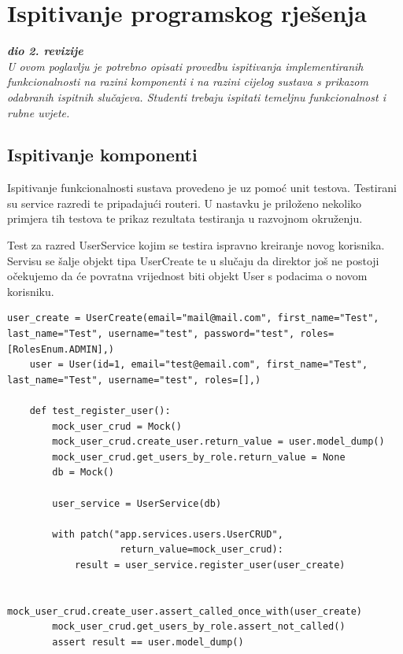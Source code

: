 			\eject 
		
	
		\section{Ispitivanje programskog rješenja}
			
			\textbf{\textit{dio 2. revizije}}\\
			
			 \textit{U ovom poglavlju je potrebno opisati provedbu ispitivanja implementiranih funkcionalnosti na razini komponenti i na razini cijelog sustava s prikazom odabranih ispitnih slučajeva. Studenti trebaju ispitati temeljnu funkcionalnost i rubne uvjete.}
	
			
			\subsection{Ispitivanje komponenti}
			
			{Ispitivanje funkcionalnosti sustava provedeno je uz pomoć unit testova. Testirani su service razredi te pripadajući routeri. U nastavku je priloženo nekoliko primjera tih testova te prikaz rezultata testiranja u razvojnom okruženju.\newline}
			
			{Test za razred UserService kojim se testira ispravno kreiranje novog korisnika. Servisu se šalje objekt tipa UserCreate te u slučaju da direktor još ne postoji očekujemo da će povratna vrijednost biti objekt User s podacima o novom korisniku.}
			
\begin{lstlisting}[style=pythonstyle]
	user_create = UserCreate(email="mail@mail.com",	first_name="Test", last_name="Test", username="test", password="test", roles=[RolesEnum.ADMIN],)
	user = User(id=1, email="test@email.com", first_name="Test", last_name="Test", username="test", roles=[],)
	
	def test_register_user():
		mock_user_crud = Mock()
		mock_user_crud.create_user.return_value = user.model_dump()
		mock_user_crud.get_users_by_role.return_value = None
		db = Mock()
		
		user_service = UserService(db)
		
		with patch("app.services.users.UserCRUD", 
					return_value=mock_user_crud):
			result = user_service.register_user(user_create)
		
		mock_user_crud.create_user.assert_called_once_with(user_create)
		mock_user_crud.get_users_by_role.assert_not_called()
		assert result == user.model_dump()
\end{lstlisting}
			
